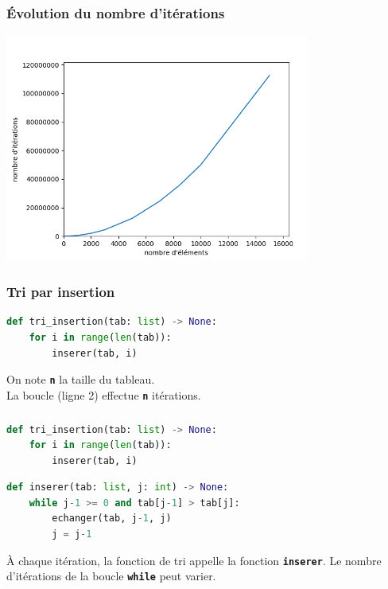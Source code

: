 \documentclass[svgnames,11pt]{beamer}
\begin{document}
\begin{frame}
    \frametitle{Évolution du nombre d'itérations}

    \begin{center}
    \centering
    \includegraphics[width=10cm]{ressources/complexite-selection.png}
    \end{center}
\end{frame}
\begin{frame}[fragile]
    \frametitle{Tri par insertion}

\begin{center}
\begin{lstlisting}[language=Python , basicstyle=\ttfamily\small, xleftmargin=2em, xrightmargin=0em]
def tri_insertion(tab: list) -> None:
    for i in range(len(tab)):
        inserer(tab, i)
\end{lstlisting}
\end{center}   
\begin{aretenir}[Observation]
On note \textbf{\texttt{n}} la taille du tableau.\\La boucle (ligne 2) effectue \textbf{\texttt{n}} itérations.
\end{aretenir}  
\end{frame}
\begin{frame}[fragile]
    \frametitle{}

\begin{center}
\begin{lstlisting}[language=Python , basicstyle=\ttfamily\small, xleftmargin=2em, xrightmargin=0em]
def tri_insertion(tab: list) -> None:
    for i in range(len(tab)):
        inserer(tab, i)
\end{lstlisting}
\begin{lstlisting}[language=Python , basicstyle=\ttfamily\small, xleftmargin=2em, xrightmargin=0em]
def inserer(tab: list, j: int) -> None:
    while j-1 >= 0 and tab[j-1] > tab[j]:
        echanger(tab, j-1, j)
        j = j-1
\end{lstlisting}
\end{center}   
\begin{aretenir}[Observation]
À chaque itération, la fonction de tri appelle la fonction \textbf{\texttt{inserer}}. Le nombre d'itérations de la boucle \textbf{\texttt{while}} peut varier.
\end{aretenir}
\end{frame}
\end{document}
